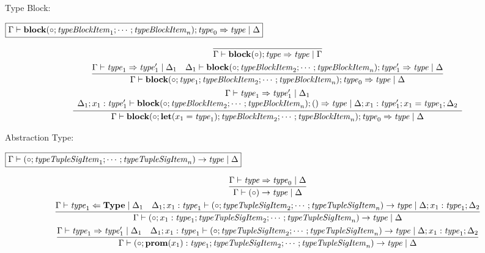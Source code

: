 Type Block:

$\fbox{$\Gamma \vdash \mathbf{block}(\circ; \mathit{typeBlockItem}_1; \cdots; \mathit{typeBlockItem}_n); \mathit{type}_0 \Rightarrow \mathit{type} \mid \Delta$}$

\begin{gather*}
  \infer{\Gamma \vdash \mathbf{block}(\circ); \mathit{type} \Rightarrow \mathit{type} \mid \Gamma}{}
  \\
  \infer{\Gamma \vdash \mathbf{block}(\circ; \mathit{type}_1; \mathit{typeBlockItem}_2; \cdots; \mathit{typeBlockItem}_n); \mathit{type}_0 \Rightarrow \mathit{type} \mid \Delta}{
    \Gamma \vdash \mathit{type}_1 \Rightarrow \mathit{type}_1' \mid \Delta_1
    &
    \Delta_1 \vdash \mathbf{block}(\circ; \mathit{typeBlockItem}_2; \cdots; \mathit{typeBlockItem}_n); \mathit{type}_1' \Rightarrow \mathit{type} \mid \Delta
  }
  \\
  \infer{\Gamma \vdash \mathbf{block}(\circ; \mathbf{let}(x_1 = \mathit{type}_1); \mathit{typeBlockItem}_2; \cdots; \mathit{typeBlockItem}_n); \mathit{type}_0 \Rightarrow \mathit{type} \mid \Delta}{
    \begin{array}{c}
      \Gamma \vdash \mathit{type}_1 \Rightarrow \mathit{type}_1' \mid \Delta_1
      \\
      \Delta_1; x_1: \mathit{type}_1' \vdash \mathbf{block}(\circ; \mathit{typeBlockItem}_2; \cdots; \mathit{typeBlockItem}_n); () \Rightarrow \mathit{type} \mid \Delta; x_1: \mathit{type}_1'; x_1 = \mathit{type}_1; \Delta_2
    \end{array}
  }
\end{gather*}

Abstraction Type:

$\fbox{$\Gamma \vdash (\circ; \mathit{typeTupleSigItem}_1; \cdots; \mathit{typeTupleSigItem}_n) \rightarrow \mathit{type} \mid \Delta$}$

\begin{gather*}
  \infer{\Gamma \vdash (\circ) \rightarrow \mathit{type} \mid \Delta}{
    \Gamma \vdash \mathit{type} \Rightarrow \mathit{type}_0 \mid \Delta
  }
  \\
  \infer{\Gamma \vdash (\circ; x_1: \mathit{type}_1; \mathit{typeTupleSigItem}_2; \cdots; \mathit{typeTupleSigItem}_n) \rightarrow \mathit{type} \mid \Delta}{
    \Gamma \vdash \mathit{type}_1 \Leftarrow \mathbf{Type} \mid \Delta_1
    &
    \Delta_1; x_1: \mathit{type}_1 \vdash (\circ; \mathit{typeTupleSigItem}_2; \cdots; \mathit{typeTupleSigItem}_n) \rightarrow \mathit{type} \mid \Delta; x_1: \mathit{type}_1; \Delta_2
  }
  \\
  \infer{\Gamma \vdash (\circ; \mathbf{prom}(x_1): \mathit{type}_1; \mathit{typeTupleSigItem}_2; \cdots; \mathit{typeTupleSigItem}_n) \rightarrow \mathit{type} \mid \Delta}{
    \Gamma \vdash \mathit{type}_1 \Rightarrow \mathit{type}_1' \mid \Delta_1
    &
    \Delta_1; x_1: \mathit{type}_1 \vdash (\circ; \mathit{typeTupleSigItem}_2; \cdots; \mathit{typeTupleSigItem}_n) \rightarrow \mathit{type} \mid \Delta; x_1: \mathit{type}_1; \Delta_2
  }
\end{gather*}
